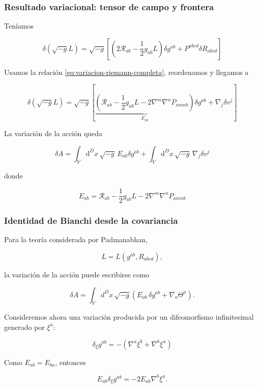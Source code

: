 \documentclass{beamer}
\newcommand{\Rcal}{\mathcal{R}}
\renewcommand{\dd}{\mathrm{d}}
\newcommand{\Eq}[1]{\eqref{#1}}
\newcommand{\DenseDisplaySpacing}{%
\setlength{\abovedisplayskip}{1pt}%
\setlength{\belowdisplayskip}{1pt}%
\setlength{\abovedisplayshortskip}{0pt}%
\setlength{\belowdisplayshortskip}{0pt}%
\setlength{\jot}{1pt}%
}
\begin{document}
\begin{frame}[label=nav-frame-033]
\frametitle{Resultado variacional: tensor de campo y frontera}
\small
\linespread{.94}\selectfont\DenseDisplaySpacing

Teníamos

\[
\delta(\sqrt{-g}L)
=
\sqrt{-g}
\left[
\left(2\Rcal_{ab}-\frac12g_{ab}L\right)\delta g^{ab}
+
P^{abcd}\delta R_{abcd}
\right]
\]

Usamos la relación \Eq{eq:variacion-riemann-completa}, reordenamos y llegamos a

\[
\delta(\sqrt{-g}L)
=
\sqrt{-g}
\left[
\underbrace{\left(
\Rcal_{ab}
-\frac12g_{ab}L
-2\nabla^m\nabla^nP_{amnb}
\right)}_{E_{ab}}\delta g^{ab}
+
\nabla_j\delta v^j
\right]
\]

La variación de la acción queda

\begin{equation}
\boxed{
\delta A
=
\int_V\dd^Dx\,\sqrt{-g}\,E_{ab}\delta g^{ab}
+
\int_V\dd^Dx\,\sqrt{-g}\,\nabla_j\delta v^j
}
\label{eq:variacion-accion-final}
\end{equation}

donde

\[
E_{ab}
=
\Rcal_{ab}
-\frac12g_{ab}L
-2\nabla^m\nabla^nP_{amnb}
\]

\end{frame}



\begin{frame}[label=nav-frame-034]
	\frametitle{Identidad de Bianchi desde la covariancia}
	\small

	Para la teoría considerada por Padmanabhan,

	\[
	L=L(g^{ab},R_{abcd}),
	\]

	la variación de la acción puede escribirse como

	\[
	\delta A
	=
	\int_V d^Dx\,\sqrt{-g}
	\left(
	E_{ab}\,\delta g^{ab}
	+
	\nabla_a\Theta^a
	\right).
	\]

	Consideremos ahora una variación producida por un
	difeomorfismo infinitesimal generado por $\xi^a$:

	\[
	\delta_\xi g^{ab}
	=
	-\left(
	\nabla^a\xi^b+\nabla^b\xi^a
	\right)
	\]

	Como $E_{ab}=E_{ba}$, entonces

	\[
	E_{ab}\delta_{\xi}g^{ab}=-2E_{ab}\nabla^b\xi^a.
	\]



\end{frame}
\end{document}
